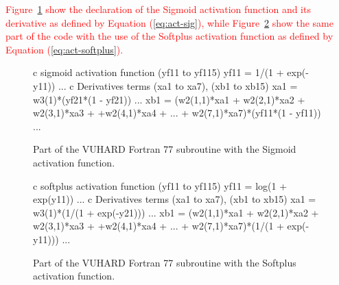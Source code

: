\documentclass[algorithms,article,submit,pdftex,oneauthors]{Definitions/mdpi}
\begin{document}
\textcolor{red}{Figure~\ref{fig:FortranSigmoid} show the declaration of the Sigmoid activation function and its derivative as defined by Equation (\ref{eq:act-sig}), while Figure~\ref{fig:FortranSoftplus} show the same part of the code with the use of the Softplus activation function as defined by Equation (\ref{eq:act-softplus}).}
\begin{figure}[h!]
\begin{FortranListing}
c sigmoid activation function (yf11 to yf115)
      yf11 = 1/(1 + exp(-y11))
      ...
c Derivatives terms (xa1 to xa7), (xb1 to xb15)
      xa1 = w3(1)*(yf21*(1 - yf21))
      ...
      xb1 = (w2(1,1)*xa1 + w2(2,1)*xa2 + w2(3,1)*xa3
     + +w2(4,1)*xa4 + ... + w2(7,1)*xa7)*(yf11*(1 - yf11))
      ...
\end{FortranListing}
\caption{Part of the VUHARD Fortran 77 subroutine with the Sigmoid activation function.\label{fig:FortranSigmoid}}
\end{figure}
\begin{figure}[h!]
\begin{FortranListing}
c softplus activation function (yf11 to yf115)
      yf11 = log(1 + exp(y11))
      ...
c Derivatives terms (xa1 to xa7), (xb1 to xb15)
      xa1 = w3(1)*(1/(1 + exp(-y21)))
      ...
      xb1 = (w2(1,1)*xa1 + w2(2,1)*xa2 + w2(3,1)*xa3
     + +w2(4,1)*xa4 + ... + w2(7,1)*xa7)*(1/(1 + exp(-y11)))
      ...
\end{FortranListing}
\caption{Part of the VUHARD Fortran 77 subroutine with the Softplus activation function.\label{fig:FortranSoftplus}}
\end{figure}
\end{document}
